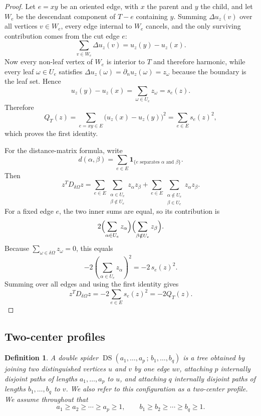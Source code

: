 \documentclass[11pt]{article}
\newtheorem{definition}[theorem]{Definition}
\theoremstyle{remark}
\newcommand{\DS}{\operatorname{DS}}
\begin{document}
\begin{proof}
Let $e=xy$ be an oriented edge, with $x$ the parent and $y$ the child, and let $W_e$ be the
descendant component of $T-e$ containing $y$.
Summing $\Delta u_z(v)$ over all vertices $v\in W_e$, every edge internal to $W_e$ cancels, and the
only surviving contribution comes from the cut edge $e$:
$$
\sum_{v\in W_e}\Delta u_z(v)=u_z(y)-u_z(x).
$$
Now every non-leaf vertex of $W_e$ is interior to $T$ and therefore harmonic, while every leaf
$\omega\in U_e$ satisfies
$\Delta u_z(\omega)=\partial_n u_z(\omega)=z_\omega$
because the boundary is the leaf set.
Hence
$$
u_z(y)-u_z(x)=\sum_{\omega\in U_e} z_\omega=s_e(z).
$$
Therefore
$$
Q_T(z)=\sum_{e=xy\in E}\bigl(u_z(x)-u_z(y)\bigr)^2=\sum_{e\in E}s_e(z)^2,
$$
which proves the first identity.

For the distance-matrix formula, write
$$
d(\alpha,\beta)=\sum_{e\in E}\mathbf 1_{\{e\text{ separates }\alpha\text{ and }\beta\}}.
$$
Then
$$
z^T D_{\delta\Omega} z
=
\sum_{e\in E}
\sum_{\substack{\alpha\in U_e\\ \beta\notin U_e}} z_\alpha z_\beta
+
\sum_{e\in E}
\sum_{\substack{\alpha\notin U_e\\ \beta\in U_e}} z_\alpha z_\beta.
$$
For a fixed edge $e$, the two inner sums are equal, so its contribution is
$$
2\Bigl(\sum_{\alpha\in U_e} z_\alpha\Bigr)
 \Bigl(\sum_{\beta\notin U_e} z_\beta\Bigr).
$$
Because $\sum_{\omega\in\delta\Omega}z_\omega=0$, this equals
$$
-2\left(\sum_{\alpha\in U_e} z_\alpha\right)^2=-2\,s_e(z)^2.
$$
Summing over all edges and using the first identity gives
$$
z^T D_{\delta\Omega} z=-2\sum_{e\in E}s_e(z)^2=-2Q_T(z).
$$
\end{proof}

\subsection{Two-center profiles}

\begin{definition}
A \emph{double spider} $\DS(a_1,\dots,a_p\,;\,b_1,\dots,b_q)$ is a tree obtained by joining two distinguished vertices $u$ and $v$ by one edge $uv$, attaching $p$
internally disjoint paths of lengths $a_1,\dots,a_p$ to $u$, and attaching $q$ internally disjoint
paths of lengths $b_1,\dots,b_q$ to $v$. We also refer to this configuration as a
\emph{two-center profile}. We assume throughout that
$$
a_1\ge a_2\ge \cdots \ge a_p\ge 1,
\qquad
b_1\ge b_2\ge \cdots \ge b_q\ge 1.
$$
\end{definition}
\end{document}
